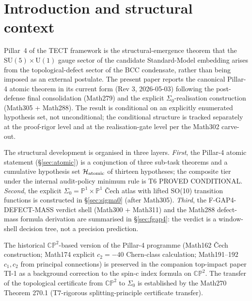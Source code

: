 \maketitle

\section{Introduction and structural context}\label{sec:intro}

Pillar~4 of the TECT framework is the structural-emergence theorem
that the $\mathrm{SU}(5) \times \mathrm{U}(1)$ gauge sector of the
candidate Standard-Model embedding arises from the topological-defect
sector of the BCC condensate, rather than being imposed as an
external postulate. The present paper reports the canonical Pillar-4
atomic theorem in its current form (Rev 3, 2026-05-03) following the
post-defense final consolidation (Math279) and the explicit
$\Sigma_0$-realisation construction (Math305 + Math288). The result
is conditional on an explicitly enumerated hypothesis set, not
unconditional; the conditional structure is tracked separately at the
proof-rigor level and at the realisation-gate level per the Math302
carve-out.

The structural development is organised in three layers. \emph{First},
the Pillar-4 atomic statement (\S\ref{sec:atomic}) is a conjunction
of three sub-task theorems and a cumulative hypothesis set
$\mathcal{H}_{\rm atomic}$ of thirteen hypotheses; the composite tier
under the internal audit-policy minimum rule is T6 PROVED CONDITIONAL.
\emph{Second}, the explicit $\Sigma_0 = \mathbb{P}^1 \times
\mathbb{P}^1$ \v{C}ech atlas with lifted SO(10) transition functions
is constructed in \S\ref{sec:sigma0} (after Math305). \emph{Third},
the F-GAP4-DEFECT-MASS verdict shell (Math300 + Math311) and the
Math288 defect-mass formula derivation are summarised in
\S\ref{sec:fgap4}: the verdict is a window-shell decision tree, not
a precision prediction.

The historical $\mathbb{CP}^2$-based version of the Pillar-4
programme (Math162 \v{C}ech construction; Math174 explicit $c_2 =
-40$ Chern-class calculation; Math191--192 $c_1, c_2$ from principal
connections) is preserved in the companion top-impact paper TI-1 as
a background correction to the spin-c index formula on
$\mathbb{CP}^2$. The transfer of the topological certificate from
$\mathbb{CP}^2$ to $\Sigma_0$ is established by the Math270 Theorem
270.1 (T7-rigorous splitting-principle certificate transfer).

